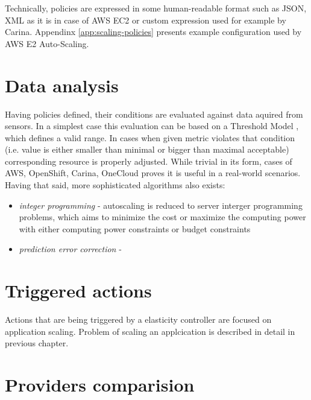 Technically, policies are expressed in some human-readable format such as JSON, XML as it is in case of AWS EC2 or custom expression used for example by Carina. Appendinx \ref{app:scaling-policies} presents example configuration used by AWS E2 Auto-Scaling.

\section{Data analysis}
Having policies defined, their conditions are evaluated against data aquired from sensors. In a simplest case this evaluation can be based on a Threshold Model \cite{LiWoZh05}, which defines a valid range. In cases when given metric violates that condition (i.e. value is either smaller than minimal or bigger than maximal acceptable) corresponding resource is properly adjusted. While trivial in its form, cases of AWS, OpenShift, Carina, OneCloud proves it is useful in a real-world scenarios. Having that said, more sophisticated algorithms also exists:
\begin{itemize}
  \item \textit{integer programming} - autoscaling is reduced to server interger programming problems, which aims to minimize the cost or maximize the computing power with either computing power constraints or
budget constraints \cite{MaLiHu10}
  \item \textit{prediction error correction} - \cite{ShSuGuWi11}
\end{itemize}

\section{Triggered actions}
Actions that are being triggered by a elasticity controller are focused on application scaling. Problem of scaling an applcication is described in detail in previous chapter.

\section{Providers comparision}

